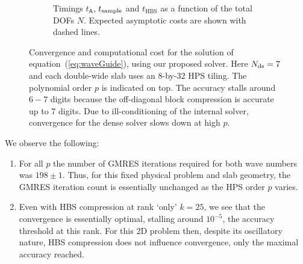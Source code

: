 \documentclass[final,onefignum,onetabnum]{siamart250211}
\newcommand{\mtx}[1]{\bm{\mathsf{#1}}}
\theoremstyle{definition}
\begin{document}
\begin{figure}[H]
\begin{subfigure}[t]{.46\linewidth}
    \caption{Timings $t_{\mtx{A}}$, $t_{\rm sample}$ and $t_{\text{HBS}}$ as a function of the total DOFs $N$. Expected asymptotic costs are shown with dashed lines.}
    \end{subfigure}    
    \caption{Convergence and computational cost for the solution of equation~(\ref{eq:waveGuide}), using our proposed solver. Here $N_{\rm ds} = 7$ and each double-wide slab uses an $8$-by-$32$ HPS tiling. The polynomial order $p$ is indicated on top. The accuracy stalls around $6-7$ digits because the off-diagonal block compression is accurate up to 7 digits. Due to ill-conditioning of the internal solver, convergence for the dense solver slows down at high $p$.}
    \label{fig:waveGuideStats}
\end{figure}
We observe the following:
\begin{enumerate}
    \item For all $p$ the number of GMRES iterations required for both wave numbers was $198 \pm 1$. Thus, for this fixed physical problem and slab geometry, the GMRES iteration count is essentially unchanged as the HPS order $p$ varies.
    \item Even with HBS compression at rank `only' $k=25$, we see that the convergence is essentially optimal, stalling around $10^{-5}$, the accuracy threshold at this rank. For this 2D problem then, despite its oscillatory nature, HBS compression does not influence convergence, only the maximal accuracy reached.
\end{enumerate}
\end{document}
